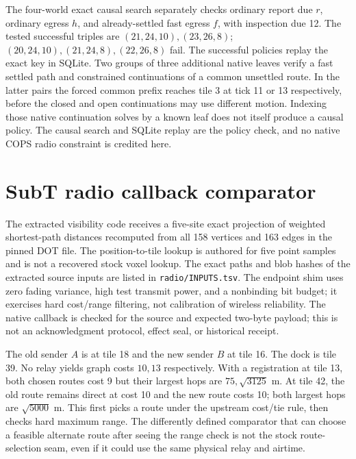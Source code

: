 \documentclass[11pt]{article}
\begin{document}
The four-world exact causal search separately checks ordinary report due
\(r\), ordinary egress \(h\), and already-settled fast egress \(f\), with
inspection due 12. The tested successful triples are
\((21,24,10),(23,26,8)\); \((20,24,10),(21,24,8),(22,26,8)\) fail.
The successful policies replay the exact key in SQLite. Two groups of
three additional native leaves verify a fast settled path and constrained
continuations of a common unsettled route. In the latter pairs the forced
common prefix reaches tile 3 at tick 11 or 13 respectively, before the
closed and open continuations may use different motion. Indexing those
native continuation solves by a known leaf does not itself produce
a causal policy. The causal search and SQLite replay are the policy
check, and no native COPS radio constraint is credited here.

\section{SubT radio callback comparator}

The extracted visibility code receives a five-site exact projection
of weighted shortest-path distances recomputed from all 158 vertices and
163 edges in the pinned DOT file. The position-to-tile lookup is authored for
five point samples and is not a recovered stock voxel lookup. The exact
paths and blob hashes of the extracted source inputs are listed in
\texttt{radio/INPUTS.tsv}. The endpoint shim uses zero fading variance,
high test transmit power, and a nonbinding bit budget; it exercises
hard cost/range filtering, not calibration of wireless reliability.
The native callback is checked for the source and expected two-byte payload;
this is not an acknowledgment protocol, effect seal, or historical receipt.

The old sender \(A\) is at tile 18 and the new sender \(B\) at tile 16.
The dock is tile 39. No relay yields graph costs \(10,13\) respectively.
With a registration at tile 13, both chosen routes cost 9 but their
largest hops are \(75,\sqrt{3125}\) m. At tile 42, the old route remains
direct at cost 10 and the new route costs 10; both largest hops are
\(\sqrt{5000}\) m. This first picks a route under the upstream cost/tie
rule, then checks hard maximum range. The differently defined comparator
that can choose a feasible alternate route after seeing the range check
is not the stock route-selection seam, even if it could use the same
physical relay and airtime.
\end{document}

